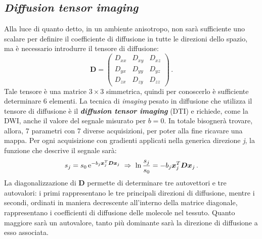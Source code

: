 \documentclass{report}
\numberwithin{equation}{section}
\numberwithin{figure}{section}
\renewcommand{\Vec}{\bm}
\begin{document}
\subsection{\textit{Diffusion tensor imaging}}
Alla luce di quanto detto, in un ambiente anisotropo, non sarà sufficiente uno scalare per definire il coefficiente di diffusione in tutte le direzioni dello spazio, ma è necessario introdurre il tensore di diffusione:
\begin{equation}
    \Vec{D} = 
     \begin{pmatrix}
      D_{xx} & D_{xy} & D_{xz} \\
      D_{yx} & D_{yy} & D_{yz} \\
      D_{zx} & D_{zy} & D_{zz} 
     \end{pmatrix}\,.
\end{equation}
Tale tensore è una matrice $3 \times 3$ simmetrica, quindi per conoscerlo è sufficiente determinare 6 elementi. La tecnica di \textit{imaging} pesato in diffusione che utilizza il tensore di diffusione è il \textbf{\textit{diffusion tensor imaging}} (DTI) e richiede, come la DWI, anche il valore del segnale misurato per $b=0$. In totale bisognerà trovare, allora, 7 parametri con 7 diverse acquisizioni, per poter alla fine ricavare una mappa. Per ogni acquisizione con gradienti applicati nella generica direzione \textit{j}, la funzione che descrive il segnale sarà:
\begin{equation}
    s_j = s_0\,\mathrm{e}^{-b_j \Vec{x}_j^T\Vec{Dx}_j} \hspace{3 pt} \Rightarrow \hspace{3 pt} \ln{\frac{s_j}{s_0}} = -b_j \Vec{x}_j^T\Vec{Dx}_j\,.
\end{equation}
La diagonalizzazione di $\Vec{D}$ permette di determinare tre autovettori e tre autovalori: i primi rappresentano le tre principali direzioni di diffusione, mentre i secondi, ordinati in maniera decrescente all'interno della matrice diagonale, rappresentano i coefficienti di diffusione delle molecole nel tessuto. Quanto maggiore sarà un autovalore, tanto più dominante sarà la direzione di diffusione a esso associata.
\end{document}
